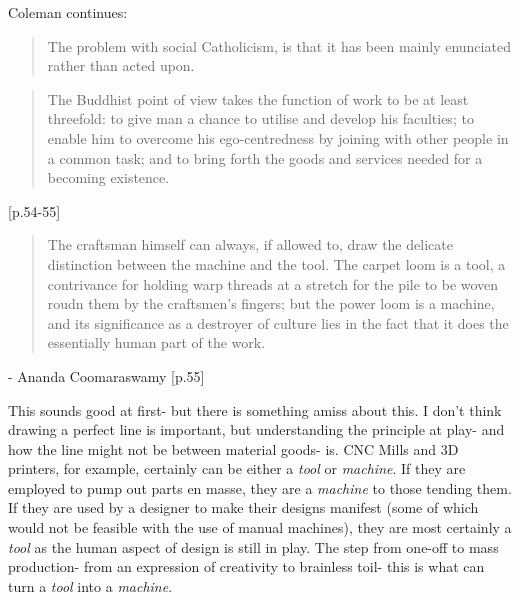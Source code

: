 \documentclass[letterpaper]{article}
\begin{document}

Coleman continues:

\begin{quote}
The problem with social Catholicism, is that it has been mainly enunciated rather than acted upon.
\end{quote}










\begin{quote}
The Buddhist point of view takes the function of work to be at least threefold: to give man a chance to utilise and develop his faculties; to enable him to overcome his ego-centredness by joining with other people in a common task; and to bring forth the goods and services needed for a becoming existence.
\end{quote} [p.54-55]

\begin{quote}
The craftsman himself can always, if allowed to, draw the delicate distinction between the machine and the tool. The carpet loom is a tool, a contrivance for holding warp threads at a stretch for the pile to be woven roudn them by the craftsmen's fingers; but the power loom is a machine, and its significance as a destroyer of culture lies in the fact that it does the essentially human part of the work.
\end{quote} - Ananda Coomaraswamy [p.55]

This sounds good at first- but there is something amiss about this. I don't think drawing a perfect line is important, but understanding the principle at play- and how the line might not be between material goods- is. CNC Mills and 3D printers, for example, certainly can be either a \textit{tool} or \textit{machine}. If they are employed to pump out parts en masse, they are a \textit{machine} to those tending them. If they are used by a designer to make their designs manifest (some of which would not be feasible with the use of manual machines), they are most certainly a \textit{tool} as the human aspect of design is still in play. The step from one-off to mass production- from an expression of creativity to brainless toil- this is what can turn a \textit{tool} into a \textit{machine}.
\end{document}
